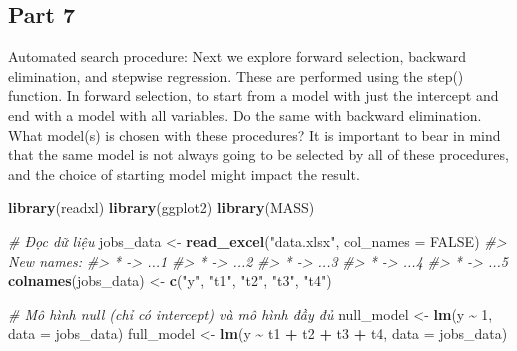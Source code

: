 \documentclass[
]{article}
\newenvironment{Shaded}{\begin{snugshade}}{\end{snugshade}}
\newcommand{\AttributeTok}[1]{\textcolor[rgb]{0.13,0.29,0.53}{#1}}
\newcommand{\CommentTok}[1]{\textcolor[rgb]{0.56,0.35,0.01}{\textit{#1}}}
\newcommand{\ConstantTok}[1]{\textcolor[rgb]{0.56,0.35,0.01}{#1}}
\newcommand{\DecValTok}[1]{\textcolor[rgb]{0.00,0.00,0.81}{#1}}
\newcommand{\FunctionTok}[1]{\textcolor[rgb]{0.13,0.29,0.53}{\textbf{#1}}}
\newcommand{\NormalTok}[1]{#1}
\newcommand{\OtherTok}[1]{\textcolor[rgb]{0.56,0.35,0.01}{#1}}
\newcommand{\SpecialCharTok}[1]{\textcolor[rgb]{0.81,0.36,0.00}{\textbf{#1}}}
\newcommand{\StringTok}[1]{\textcolor[rgb]{0.31,0.60,0.02}{#1}}
\begin{document}
\subsection{Part 7}\label{part-7}

Automated search procedure: Next we explore forward selection, backward
elimination, and stepwise regression. These are performed using the
step() function. In forward selection, to start from a model with just
the intercept and end with a model with all variables. Do the same with
backward elimination. What model(s) is chosen with these procedures? It
is important to bear in mind that the same model is not always going to
be selected by all of these procedures, and the choice of starting model
might impact the result.

\begin{Shaded}
\begin{Highlighting}[]
\FunctionTok{library}\NormalTok{(readxl)}
\FunctionTok{library}\NormalTok{(ggplot2)}
\FunctionTok{library}\NormalTok{(MASS)}

\CommentTok{\# Đọc dữ liệu}
\NormalTok{jobs\_data }\OtherTok{\textless{}{-}} \FunctionTok{read\_excel}\NormalTok{(}\StringTok{"data.xlsx"}\NormalTok{, }\AttributeTok{col\_names =} \ConstantTok{FALSE}\NormalTok{)}
\CommentTok{\#\textgreater{} New names:}
\CommentTok{\#\textgreater{} * \textasciigrave{}\textasciigrave{} {-}\textgreater{} \textasciigrave{}...1\textasciigrave{}}
\CommentTok{\#\textgreater{} * \textasciigrave{}\textasciigrave{} {-}\textgreater{} \textasciigrave{}...2\textasciigrave{}}
\CommentTok{\#\textgreater{} * \textasciigrave{}\textasciigrave{} {-}\textgreater{} \textasciigrave{}...3\textasciigrave{}}
\CommentTok{\#\textgreater{} * \textasciigrave{}\textasciigrave{} {-}\textgreater{} \textasciigrave{}...4\textasciigrave{}}
\CommentTok{\#\textgreater{} * \textasciigrave{}\textasciigrave{} {-}\textgreater{} \textasciigrave{}...5\textasciigrave{}}
\FunctionTok{colnames}\NormalTok{(jobs\_data) }\OtherTok{\textless{}{-}} \FunctionTok{c}\NormalTok{(}\StringTok{"y"}\NormalTok{, }\StringTok{"t1"}\NormalTok{, }\StringTok{"t2"}\NormalTok{, }\StringTok{"t3"}\NormalTok{, }\StringTok{"t4"}\NormalTok{)}

\CommentTok{\# Mô hình null (chỉ có intercept) và mô hình đầy đủ}
\NormalTok{null\_model }\OtherTok{\textless{}{-}} \FunctionTok{lm}\NormalTok{(y }\SpecialCharTok{\textasciitilde{}} \DecValTok{1}\NormalTok{, }\AttributeTok{data =}\NormalTok{ jobs\_data)}
\NormalTok{full\_model }\OtherTok{\textless{}{-}} \FunctionTok{lm}\NormalTok{(y }\SpecialCharTok{\textasciitilde{}}\NormalTok{ t1 }\SpecialCharTok{+}\NormalTok{ t2 }\SpecialCharTok{+}\NormalTok{ t3 }\SpecialCharTok{+}\NormalTok{ t4, }\AttributeTok{data =}\NormalTok{ jobs\_data)}


\end{Highlighting}
\end{Shaded}
\end{document}
